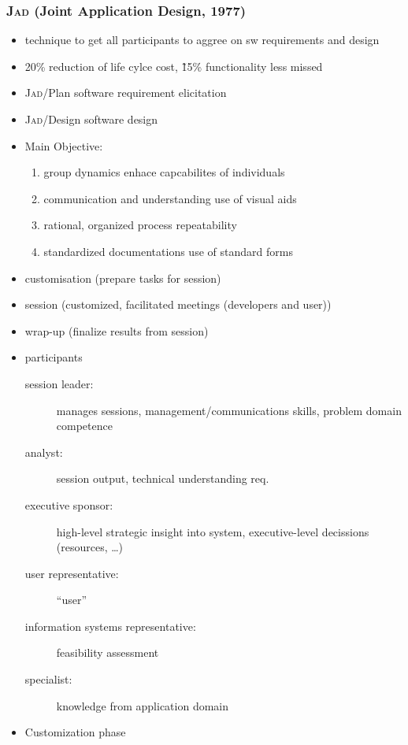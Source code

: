 \documentclass[a4paper, 10pt]{article}
\begin{document}
\subsubsection{\textsc{Jad} (Joint Application Design, 1977)}
\begin{itemize}
	\item technique to get all participants to aggree on sw requirements and design
	\item 20\% reduction of life cylce cost, \~15\% functionality less missed
	\item \textsc{Jad}/Plan \follows software requirement elicitation
	\item \textsc{Jad}/Design \follows software design
	\item Main Objective:
		\begin{enumerate}
			\item group dynamics \follows enhace capcabilites of individuals
			\item communication and understanding \follows use of visual 	aids
			\item rational, organized process \follows repeatability
			\item standardized documentations \follows use of standard forms
		\end{enumerate}
	\item customisation (prepare tasks for session)
	\item session (customized, facilitated meetings (developers and user))
	\item wrap-up (finalize results from session)
	\item participants
		\begin{description}
			\item[session leader:] manages sessions, management/communications skills, problem domain competence
			\item[analyst:] \follows session output, technical understanding req.
			\item[executive sponsor:] high-level strategic insight into system, executive-level decissions (resources, \dots)
			\item[user representative:] ``user''
			\item[information systems representative:] feasibility assessment
			\item[specialist:] knowledge from application domain
		\end{description}
	\item Customization phase
	\begin{itemize}

\end{itemize}
\end{itemize}
\end{document}
